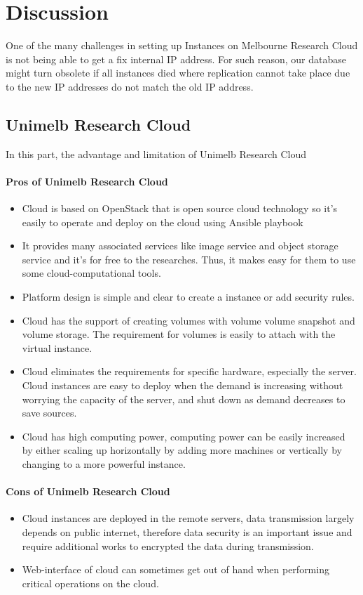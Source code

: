 
\section{Discussion}

One of the many challenges in setting up Instances on Melbourne Research Cloud is not being able to get a fix internal IP address. For such reason, our database might turn obsolete if all instances died where replication cannot take place due to the new IP addresses do not match the old IP address. 

\subsection{Unimelb Research Cloud}
In this part, the advantage and limitation of Unimelb Research Cloud
\paragraph{Pros of Unimelb Research Cloud}
\begin{itemize}
\item Cloud is based on OpenStack that is open source cloud technology so it's easily to operate and deploy on the cloud  using Ansible playbook
\item It provides many associated services like image service and object storage service and it's for free to the researches. Thus, it makes easy for them to use some cloud-computational tools.
\item Platform design is simple and clear to create a instance or add security rules. 
\item Cloud has the support of creating volumes with volume volume snapshot and volume storage. The requirement for volumes is easily to attach with the virtual instance.
\item Cloud eliminates the requirements for specific hardware, especially the server. Cloud instances are easy to deploy when the demand is increasing without worrying the capacity of the server, and shut down as demand decreases to save sources. 
\item Cloud has high computing power, computing power can be easily increased by either scaling up horizontally by adding more machines or vertically by changing to a more powerful instance.
\end{itemize}
\paragraph{Cons of Unimelb Research Cloud}
\begin{itemize}
   \item Cloud instances are deployed in the remote servers, data transmission largely depends on public internet, therefore data security is an important issue and require additional works to encrypted the data during transmission. 
   \item Web-interface of cloud can sometimes get out of hand when performing critical operations on the cloud.
   
\end{itemize}

